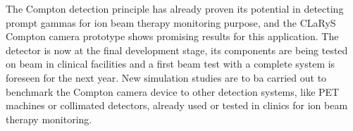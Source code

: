 The Compton detection principle has already proven its potential in detecting prompt gammas for ion beam therapy monitoring purpose, and the CLaRyS Compton camera prototype shows promising results for this application. The detector is now at the final development stage, its components are being tested on beam in clinical facilities and a first beam test with a complete system is foreseen for the next year. New simulation studies are to ba carried out to benchmark the Compton camera device to other detection systems, like PET machines or collimated detectors, already used or tested in clinics for ion beam therapy monitoring.            


